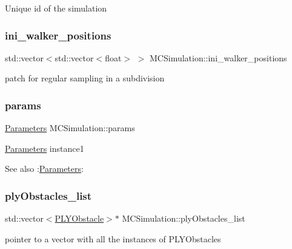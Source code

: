 Unique id of the simulation \mbox{\label{class_m_c_simulation_af53387a4edc7627a77ff03a562f8befa}} 
\subsubsection{\texorpdfstring{ini\+\_\+walker\+\_\+positions}{ini\_walker\_positions}}
{\footnotesize\ttfamily std\+::vector$<$std\+::vector$<$float$>$ $>$ M\+C\+Simulation\+::ini\+\_\+walker\+\_\+positions}

patch for regular sampling in a subdivision \mbox{\label{class_m_c_simulation_aecb8470cb31fa67e38c5d5acd5a80bef}} 
\subsubsection{\texorpdfstring{params}{params}}
{\footnotesize\ttfamily \hyperlink{class_parameters}{Parameters} M\+C\+Simulation\+::params}

\hyperlink{class_parameters}{Parameters} instance1 \begin{DoxySeeAlso}{See also}
\+:\hyperlink{class_parameters}{Parameters}\+: 
\end{DoxySeeAlso}
\mbox{\label{class_m_c_simulation_a8c21d28d54c9c947f6c5465657019ed4}} 
\subsubsection{\texorpdfstring{ply\+Obstacles\+\_\+list}{plyObstacles\_list}}
{\footnotesize\ttfamily std\+::vector$<$\hyperlink{class_p_l_y_obstacle}{P\+L\+Y\+Obstacle}$>$$\ast$ M\+C\+Simulation\+::ply\+Obstacles\+\_\+list}

pointer to a vector with all the instances of P\+L\+Y\+Obstacles \mbox{\label{class_m_c_simulation_a87ba6332f1f49024a442981b477360c4}} 
